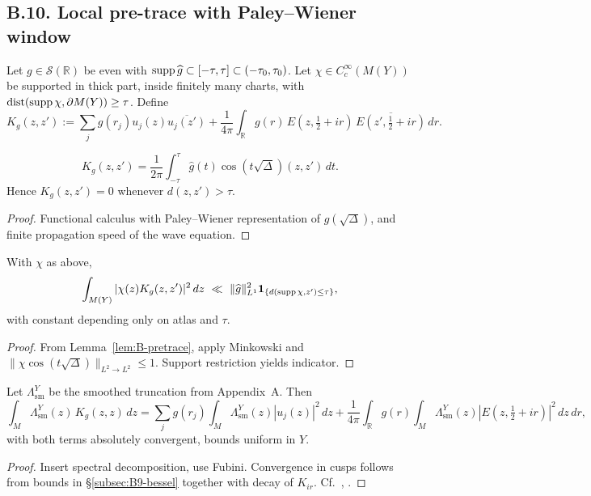 \subsection*{B.10. Local pre-trace with Paley–Wiener window}
\label{subsec:B10-pretrace}

Let $g\in\mathcal S(\mathbb R)$ be even with $\operatorname{supp}\widehat g\subset[-\tau,\tau]\subset(-\tau_0,\tau_0)$.
Let $\chi\in C_c^\infty(M(Y))$ be supported in thick part, inside finitely many charts,
with $\operatorname{dist}(\operatorname{supp}\chi,\partial M(Y))\ge\tau$. Define
\[
K_g(z,z') := \sum_j g(r_j)u_j(z)\overline{u_j(z')}
+ \frac{1}{4\pi}\int_{\mathbb R} g(r)\,E(z,\tfrac12+ir)\,\overline{E(z',\tfrac12+ir)}\,dr.
\]

\begin{lemma}
\label{lem:B-pretrace}
\[
K_g(z,z') = \frac{1}{2\pi}\int_{-\tau}^{\tau}\widehat g(t)\cos(t\sqrt\Delta)(z,z')\,dt.
\]
Hence $K_g(z,z')=0$ whenever $d(z,z')>\tau$.
\end{lemma}

\begin{proof}
Functional calculus with Paley–Wiener representation of $g(\sqrt\Delta)$,
and finite propagation speed of the wave equation.
\end{proof}

\begin{proposition}
\label{prop:B-pretrace}
With $\chi$ as above,
\[
\int_{M(Y)}|\chi(z)K_g(z,z')|^2\,dz
\ \ll\ \|\widehat g\|_{L^1}^2 \mathbf 1_{\{d(\operatorname{supp}\chi,z')\le\tau\}},
\]
with constant depending only on atlas and $\tau$.
\end{proposition}

\begin{proof}
From Lemma~\ref{lem:B-pretrace}, apply Minkowski and
$\|\chi\cos(t\sqrt\Delta)\|_{L^2\to L^2}\le1$.
Support restriction yields indicator.
\end{proof}

\begin{theorem}
\label{thm:B-pretraceY}
Let $\Lambda^Y_{\mathrm{sm}}$ be the smoothed truncation from Appendix~A. Then
\[
\int_M \Lambda^Y_{\mathrm{sm}}(z)\,K_g(z,z)\,dz
= \sum_j g(r_j)\int_M \Lambda^Y_{\mathrm{sm}}(z)|u_j(z)|^2\,dz
+ \frac{1}{4\pi}\int_{\mathbb R} g(r)\int_M \Lambda^Y_{\mathrm{sm}}(z)|E(z,\tfrac12+ir)|^2\,dz\,dr,
\]
with both terms absolutely convergent, bounds uniform in $Y$.
\end{theorem}

\begin{proof}
Insert spectral decomposition, use Fubini. Convergence in cusps follows from
bounds in \S\ref{subsec:B9-bessel} together with decay of $K_{ir}$.
Cf.\ \cite[Ch.~3]{Iwaniec2002}, \cite[§7.3]{Borthwick}.
\end{proof}

